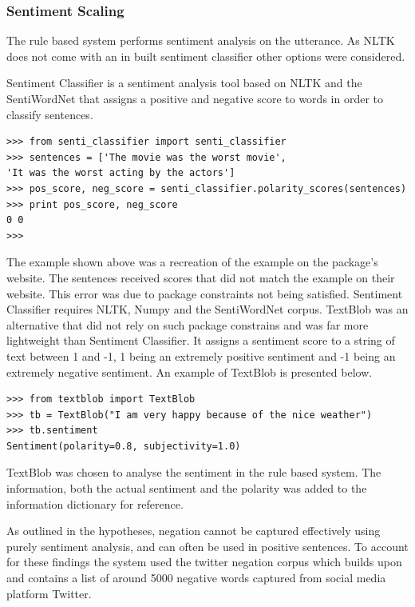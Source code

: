 \documentclass[bsc,frontabs,twoside,singlespacing,parskip]{infthesis}
\begin{document}
%	

\subsubsection{Sentiment Scaling}

The rule based system performs sentiment analysis on the utterance. As NLTK does not come with an in built sentiment classifier other options were considered. 

Sentiment Classifier \cite{senti_class} is a sentiment analysis tool based on NLTK and the SentiWordNet that assigns a positive and negative score to words in order to classify sentences.


\begin{lstlisting}
>>> from senti_classifier import senti_classifier
>>> sentences = ['The movie was the worst movie', 
'It was the worst acting by the actors']
>>> pos_score, neg_score = senti_classifier.polarity_scores(sentences)
>>> print pos_score, neg_score
0 0
>>> 
\end{lstlisting}
The example shown above was a recreation of the example on the package's website. The sentences received scores that did not match the example on their website. This error was due to package constraints not being satisfied. Sentiment Classifier requires NLTK, Numpy and the SentiWordNet corpus. TextBlob \cite{text_blob} was an alternative that did not rely on such package constrains and was far more lightweight than Sentiment Classifier. It assigns a sentiment score to a string of text between 1 and -1, 1 being an extremely positive sentiment and -1 being an extremely negative sentiment. An example of TextBlob is presented below.

\begin{lstlisting}
>>> from textblob import TextBlob
>>> tb = TextBlob("I am very happy because of the nice weather")
>>> tb.sentiment
Sentiment(polarity=0.8, subjectivity=1.0)
\end{lstlisting}

TextBlob was chosen to analyse the sentiment in the rule based system. The information, both the actual sentiment and the polarity was added to the information dictionary for reference.

As outlined in the hypotheses, negation cannot be captured effectively using purely sentiment analysis, and can often be used in positive sentences. To account for these findings the system used the twitter negation corpus \cite{neg_corpus} which builds upon \cite{negation_corpus_1}\cite{negation_corpus_2} and contains a list of around 5000 negative words captured from social media platform Twitter.
\end{document}
